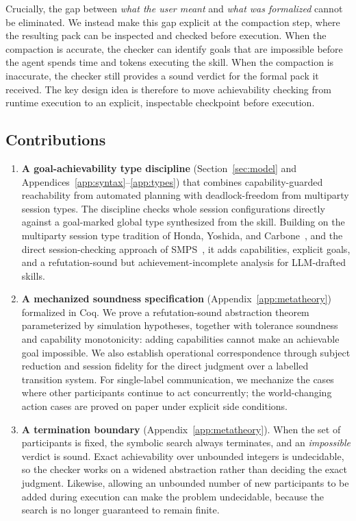 \documentclass{article}
\theoremstyle{plain}
\theoremstyle{definition}
\def \bmr {}
\def \emr {}
\def \bgc {}
\def \egc {}
\begin{document}
Crucially, the gap between \emph{what the user meant} and \emph{what was formalized} cannot be eliminated. We instead make this gap explicit at the compaction step, where the resulting pack can be inspected and checked before execution. When the compaction is accurate, the checker can identify goals that are impossible before the agent spends time and tokens executing the skill. When the compaction is inaccurate, the checker still provides a sound verdict for the formal pack it received. The key design idea is therefore to move achievability checking from runtime execution to an explicit, inspectable checkpoint before execution.

\subsection{Contributions}
\begin{enumerate}\setlength{\itemsep}{2pt}

\item \textbf{A goal-achievability type discipline}
(Section~\ref{sec:model} and Appendices~\ref{app:syntax}--\ref{app:types}) that combines capability-guarded reachability from automated planning with deadlock-freedom from multiparty session types. The discipline checks whole session configurations directly against a goal-marked global type synthesized from the skill. Building on the multiparty session type tradition of Honda, Yoshida, and Carbone~\cite{honda1998language,honda}, and the direct session-checking approach of \bmr SMPS~\cite{synthetic2023,synthetic2026}, \emr it adds capabilities, explicit goals, and a refutation-sound but achievement-incomplete analysis for LLM-drafted skills.

\item \textbf{A mechanized soundness specification}
(Appendix~\ref{app:metatheory}) formalized in Coq. We prove a refutation-sound abstraction theorem parameterized by simulation hypotheses, together with tolerance soundness and capability monotonicity: adding capabilities cannot make an achievable goal impossible. We also establish operational correspondence through subject reduction and session fidelity for the direct judgment over a labelled transition system. For single-label communication, we mechanize the cases where other participants continue to act concurrently; the world-changing action cases are proved on paper under explicit side conditions.

\item \textbf{A termination boundary}
(Appendix~\ref{app:metatheory}). \bgc When the set of participants is fixed, the
symbolic search always terminates, and an \emph{impossible} verdict is sound.
Exact achievability over unbounded integers is undecidable, so the checker works
on a widened abstraction rather than deciding the exact judgment. Likewise,
allowing an unbounded number of new participants to be added during execution
can make the problem undecidable, because the search is no longer guaranteed to
remain finite.\egc


\end{enumerate}
\end{document}
